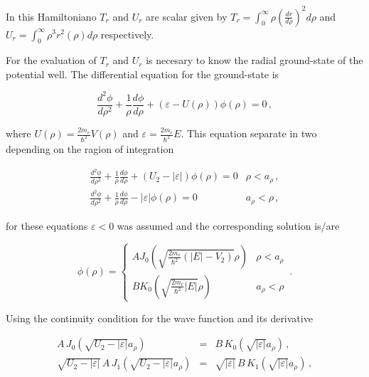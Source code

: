 \documentclass[a4paper,10pt]{article}
\begin{document}
\noindent In this Hamiltoniano $T_r$ and $U_r$ are scalar given by $T_r = \int_0^{\infty} \rho \left(\frac{dr}{d\rho}\right)^2 d\rho$ and
$U_r = \int_0^{\infty} \rho^3 r^2(\rho) d\rho$ respectively.

For the evaluation of $T_r$ and $U_r$ is necesary to know the radial ground-state of the potential well. The differential
equation for the ground-state is

\begin{equation}
\frac{d^2\phi}{d\rho^2} + \frac{1}{\rho} \frac{d\phi}{d\rho} + \left(\varepsilon - U(\rho)\right) \phi(\rho) = 0\,,
\end{equation}

\noindent where $U(\rho) = \frac{2 m_e}{\hbar^2} V(\rho)$ and $\varepsilon = \frac{2 m_e}{\hbar^2} E$. This equation
separate in two depending on the ragion of integration

\begin{equation}
\begin{matrix}
\frac{d^2\phi}{d\rho^2} + \frac{1}{\rho} \frac{d\phi}{d\rho} + \left(U_2 - |\varepsilon|\right) \phi(\rho) = 0 & \rho<a_{\rho}\,, \\
\frac{d^2\phi}{d\rho^2} + \frac{1}{\rho} \frac{d\phi}{d\rho} - |\varepsilon| \phi(\rho) = 0 & a_{\rho}<\rho\,,
\end{matrix}
\end{equation}

\noindent for these equations $\varepsilon<0$ was assumed and the corresponding solution is/are

\begin{equation}
\phi(\rho) = \left\{\begin{matrix}
                      A J_0\left(\sqrt{\frac{2 m_e}{\hbar^2}\left(|E| - V_2\right)} \rho\right) & \rho<a_{\rho} \\
                      B K_0\left(\sqrt{\frac{2 m_e}{\hbar^2}|E|} \rho\right) & a_{\rho}<\rho
                    \end{matrix}
             \right.\,.
\end{equation}

Using the continuity condition for the wave function and its derivative

\begin{eqnarray}
A\,J_0(\sqrt{U_2-|\varepsilon|}a_{\rho}) &=& B\,K_0(\sqrt{|\varepsilon|}a_{\rho} ) \,, \\
\sqrt{U_2-|\varepsilon|}\,A\,J_1(\sqrt{U_2-|\varepsilon|}a_{\rho}) &=& \sqrt{|\varepsilon|}\,B\,K_1(\sqrt{|\varepsilon|}a_{\rho} )\,,
\end{eqnarray}
\end{document}
